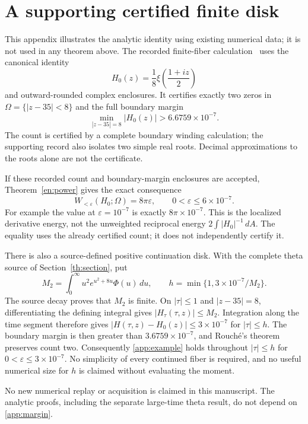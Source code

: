 \section{A supporting certified finite disk}
\label{app:numerics}

This appendix illustrates the analytic identity using existing numerical
data; it is not used in any theorem above. The recorded finite-fiber
calculation~\cite{RHErecord} uses the canonical identity
\[
 H_0(z)=\frac18\xi\left(\frac{1+iz}{2}\right)
\]
and outward-rounded complex enclosures. It certifies exactly two zeros
in $\Omega=\{|z-35|<8\}$ and the full boundary margin
\begin{equation}\label{app:margin}
 \min_{|z-35|=8}|H_0(z)|>6.6759\times10^{-7}.
\end{equation}
The count is certified by a complete boundary winding calculation;
the supporting record also isolates two simple real roots. Decimal
approximations to the roots alone are not the certificate.

If these recorded count and boundary-margin enclosures are accepted,
Theorem~\ref{en:power} gives the exact consequence
\begin{equation}\label{app:example}
 W_{<\varepsilon}(H_0;\Omega)=8\pi\varepsilon,
 \qquad0<\varepsilon\le6\times10^{-7}.
\end{equation}
For example the value at $\varepsilon=10^{-7}$ is exactly
$8\pi\times10^{-7}$. This is the localized derivative energy, not the
unweighted reciprocal energy $2\int|H_0|^{-1}\,dA$. The equality
uses the already certified count; it does not independently certify it.

There is also a source-defined positive continuation disk. With the
complete theta source of Section~\ref{th:section}, put
\[
 M_2=\int_0^\infty u^2e^{u^2+8u}\Phi(u)\,du,\qquad
 h=\min\{1,3\times10^{-7}/M_2\}.
\]
The source decay proves that $M_2$ is finite. On $|\tau|\le1$ and
$|z-35|=8$, differentiating the defining integral gives
$|H_\tau(\tau,z)|\le M_2$. Integration along the time segment therefore
gives $|H(\tau,z)-H_0(z)|\le3\times10^{-7}$ for $|\tau|\le h$.
The boundary margin is then greater than $3.6759\times10^{-7}$,
and Rouch\'e's theorem preserves count two. Consequently
\eqref{app:example} holds throughout $|\tau|\le h$ for
$0<\varepsilon\le3\times10^{-7}$. No simplicity of every continued
fiber is required, and no useful numerical size for $h$ is claimed
without evaluating the moment.

No new numerical replay or acquisition is claimed in this manuscript.
The analytic proofs, including the separate large-time theta result,
do not depend on \eqref{app:margin}.
